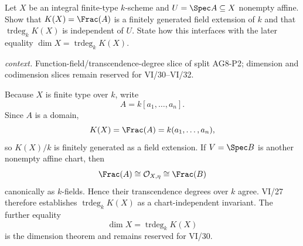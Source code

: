 \begin{problem}\label{prob:vi27-p04}
Let \(X\) be an integral finite-type \(k\)-scheme and \(U=\Spec A\subseteq X\) nonempty affine. Show that \(K(X)=\Frac(A)\) is a finitely generated field extension of \(k\) and that \(\operatorname{trdeg}_kK(X)\) is independent of \(U\). State how this interfaces with the later equality \(\dim X=\operatorname{trdeg}_kK(X)\).
\par\smallskip\noindent\textit{context.} Function-field/transcendence-degree slice of split AG8-P2; dimension and codimension slices remain reserved for VI/30--VI/32.
\end{problem}

\ifdefined\FullProblemDossiers
\begin{solution}
Because \(X\) is finite type over \(k\), write
\[
A=k[a_1,\ldots,a_n].
\]
Since \(A\) is a domain,
\[
K(X)=\Frac(A)=k(a_1,\ldots,a_n),
\]
so \(K(X)/k\) is finitely generated as a field extension. If \(V=\Spec B\) is another nonempty affine chart,
then
\[
\Frac(A)\cong\mathcal O_{X,\eta}\cong\Frac(B)
\]
canonically as \(k\)-fields. Hence their transcendence degrees over \(k\) agree. VI/27 therefore establishes
\(\operatorname{trdeg}_kK(X)\) as a chart-independent invariant. The further equality
\[
\dim X=\operatorname{trdeg}_kK(X)
\]
is the dimension theorem and remains reserved for VI/30.
\end{solution}
\fi
